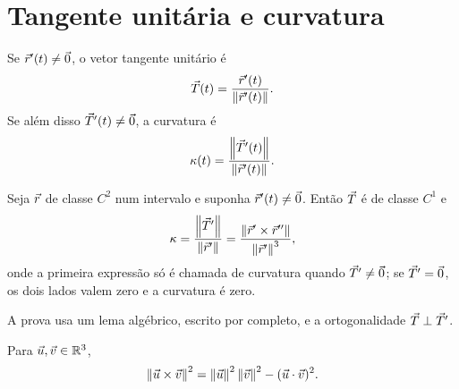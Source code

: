 \documentclass[11pt,a4paper]{article}
\begin{document}
\section{Tangente unitária e curvatura}

\begin{definicao}
Se \(\vec{r}'(t)\neq\vec{0}\), o vetor tangente unitário é
\[
\vec{T}(t)=\frac{\vec{r}'(t)}{\left\lVert \vec{r}'(t) \right\rVert}.
\]
Se além disso \(\vec{T}'(t)\neq\vec{0}\), a curvatura é
\[
\kappa(t)=\frac{\left\lVert \vec{T}'(t) \right\rVert}{\left\lVert \vec{r}'(t) \right\rVert}.
\]
\end{definicao}

\begin{teorema}
Seja \(\vec{r}\) de classe \(C^2\) num intervalo e suponha \(\vec{r}'(t)\neq\vec{0}\). Então \(\vec{T}\) é de classe \(C^1\) e
\begin{equation}
\kappa
=\frac{\left\lVert \vec{T}' \right\rVert}{\left\lVert \vec{r}' \right\rVert}
=\frac{\left\lVert \vec{r}'\times\vec{r}'' \right\rVert}{\left\lVert \vec{r}' \right\rVert^{3}},
\label{eq:curvatura}
\end{equation}
onde a primeira expressão só é chamada de curvatura quando \(\vec{T}'\neq\vec{0}\); se \(\vec{T}'=\vec{0}\), os dois lados valem zero e a curvatura é zero.
\end{teorema}

A prova usa um lema algébrico, escrito por completo, e a ortogonalidade \(\vec{T}\perp\vec{T}'\).

\begin{lema}
Para \(\vec{u},\vec{v}\in\mathbb{R}^3\),
\[
\left\lVert \vec{u}\times\vec{v} \right\rVert^{2}
=\left\lVert \vec{u} \right\rVert^{2}\left\lVert \vec{v} \right\rVert^{2}-(\vec{u}\cdot\vec{v})^{2}.
\]
\end{lema}
\end{document}
